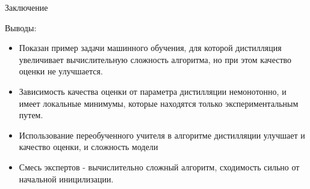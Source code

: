 \documentclass{beamer}
\begin{document}
\begin{frame}{Заключение}
\begin{block}{Выводы:}
\begin{itemize}
  \item Показан пример задачи машинного обучения, для которой дистилляция увеличивает вычислительную сложность алгоритма, но при этом качество оценки не улучшается.

  \item Зависимость качества оценки от параметра дистилляции немонотонно, и имеет локальные минимумы, которые находятся только экспериментальным путем.

\item Использование переобученного учителя в алгоритме дистилляции улучшает и качество оценки, и сложность модели

 \item Смесь экспертов - вычислительно сложный алгоритм, сходимость сильно от начальной иницилизации.

\end{itemize}
\end{block}
\end{frame}
\end{document}
